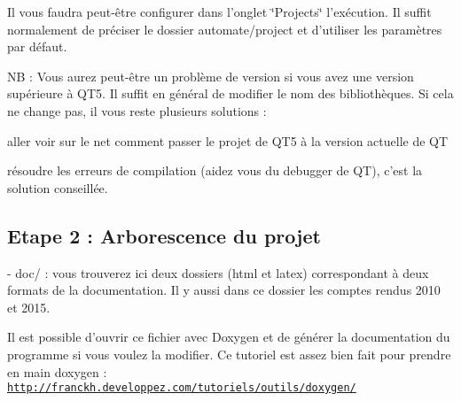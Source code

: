 Il vous faudra peut-\/être configurer dans l'onglet \char`\"{}\-Projects\char`\"{} l'exécution. Il suffit normalement de préciser le dossier automate/project et d'utiliser les paramètres par défaut.

N\-B \-: Vous aurez peut-\/être un problème de version si vous avez une version supérieure à Q\-T5. Il suffit en général de modifier le nom des bibliothèques. Si cela ne change pas, il vous reste plusieurs solutions \-:
\begin{DoxyItemize}
\item aller voir sur le net comment passer le projet de Q\-T5 à la version actuelle de Q\-T
\item résoudre les erreurs de compilation (aidez vous du debugger de Q\-T), c'est la solution conseillée.
\end{DoxyItemize}\hypertarget{index_etape2}{}\subsection{Etape 2 \-: Arborescence du projet}\label{index_etape2}
\begin{DoxyVerb}   - doc/ : vous trouverez ici deux dossiers (html et latex) correspondant à deux formats de la documentation. Il y aussi dans ce dossier les comptes rendus 2010 et 2015.
\end{DoxyVerb}
 Il est possible d'ouvrir ce fichier avec Doxygen et de générer la documentation du programme si vous voulez la modifier. Ce tutoriel est assez bien fait pour prendre en main doxygen \-: \href{http://franckh.developpez.com/tutoriels/outils/doxygen/}{\tt http\-://franckh.\-developpez.\-com/tutoriels/outils/doxygen/}

